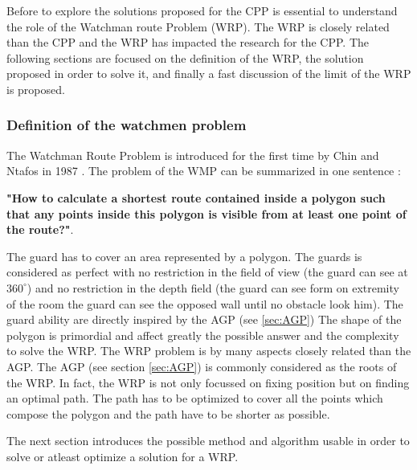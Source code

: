 Before to explore the solutions proposed for the CPP is essential to understand the role of the Watchman route Problem (WRP). The WRP is closely related than the CPP and the WRP has impacted the research for the CPP. 
The following sections are focused on the definition of the WRP, the solution proposed in order to solve it, and finally a fast discussion of the limit of the WRP  is proposed.
 
\subsubsection{Definition of the watchmen problem }

The Watchman Route Problem is introduced for the first time by Chin and Ntafos in 1987 \cite{54*chin1988}. The problem of the WMP can be summarized in one sentence :

\textbf{"How to calculate a shortest route contained inside a polygon such that any points inside this polygon is visible from at least one point of the route?"}.  

The guard has to cover an area represented by a polygon. The guards is considered as perfect with no restriction in the field of view (the guard can see at $360^\circ$) and no restriction in the depth field (the guard can see form on extremity of the room the guard can see the opposed wall until no obstacle look him). The guard ability are directly inspired by the AGP (see \ref{sec:AGP})
The shape of the polygon is primordial and affect greatly the possible answer and the complexity to solve the WRP.
The WRP problem is by many aspects closely related than the AGP. The AGP (see  section \ref{sec:AGP}) is commonly considered as the roots of the WRP.
 In fact, the WRP is not only focussed on fixing position but on finding an optimal path. The path has to be optimized to cover all the points which compose the polygon  and the path have to be shorter as possible.
 
 The next section introduces the possible method and algorithm usable in order to solve or atleast optimize a solution for a WRP.
 



 
